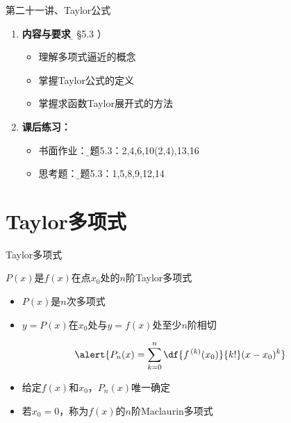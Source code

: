 \begin{frame}{第二十一讲、Taylor公式}
	\linespread{1.5}
	\begin{enumerate}
	  \item {\bf 内容与要求}{\b（ \S 5.3 ）}
	  \begin{itemize}
	    \item 理解多项式逼近的概念
	    \item 掌握Taylor公式的定义
	    \item 掌握求函数Taylor展开式的方法
	  \vspace{1em}
	  \end{itemize}
	  \item {\bf 课后练习：}
	  \begin{itemize}
	    \item 书面作业：{\b 习题5.3：2,4,6,10(2,4),13,16}
 	    \item 思考题：{\b 习题5.3：1,5,8,9,12,14}
	  \end{itemize}
	\end{enumerate}
\end{frame}

\section{Taylor多项式}

\begin{frame}{Taylor多项式}
	\linespread{1.2}\pause 
	\begin{block}{{\bb $P(x)$是$f(x)$在点$x_0$处的$n$阶Taylor多项式}\hfill}\pause 
		\begin{itemize}
		  \item $P(x)$是$n$次多项式\pause 
		  \item $y=P(x)$在$x_0$处与$y=f(x)$处至少$n$阶相切\pause 
		\end{itemize}
	\end{block}\pause 
	$$\alert{P_n(x)=\sum\limits_{k=0}^n\df{f^{\,(k)}(x_0)}{k!}(x-x_0)^k}$$
	\begin{itemize}\pause 
	  \item \alert{给定$f(x)$和$x_0$，$P_n(x)$唯一确定}\pause 
	  \item 若$x_0=0$，称为{\bb $f(x)$的$n$阶Maclaurin多项式}
	\end{itemize}
\end{frame}

